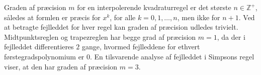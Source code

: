 Graden af præcision $m$ for en interpolerende kvadraturregel er det største $n \in \mathbb{Z^+}$, således at formlen er præcis for $x^k$, for alle $k = 0, 1, \ldots , n$, men ikke for $n+1$.
Ved at betragte fejlleddet for hver regel kan graden af præcision udledes trivielt. 
Midtpunktsreglen og trapezreglen har begge grad af præcision $m=1$, da der i fejlleddet differentieres $2$ gange, hvormed fejlleddene for ethvert førstegradspolynomium er $0$. 
En tilsvarende analyse af fejlleddet i Simpsons regel viser, at den har graden af præcision $m=3$.
%